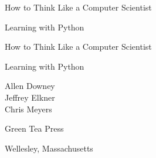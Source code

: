 \documentclass[10pt]{book}
\newcommand{\clearemptydoublepage}{\newpage{\pagestyle{empty}\cleardoublepage}}
\renewcommand{\clearemptydoublepage}{\cleardoublepage}
\begin{document}
\frontmatter

\thispagestyle{empty}

\begin{flushright}
\vspace*{2.5in}

{\huge How to Think Like a Computer Scientist}

\vspace{1in}

{\LARGE Learning with Python}

\vfill

\end{flushright}


\clearemptydoublepage

\pagebreak
\thispagestyle{empty}

\begin{flushright}
\vspace*{2.5in}

{\huge How to Think Like a Computer Scientist}

\vspace{0.25in}

{\LARGE Learning with Python}

\vspace{1in}

{\Large
Allen Downey\\
Jeffrey Elkner\\
Chris Meyers\\
}


\vspace{1in}

{\Large Green Tea Press}

{\small Wellesley, Massachusetts}

\vfill

\end{flushright}


\pagebreak
\thispagestyle{empty}
\end{document}
